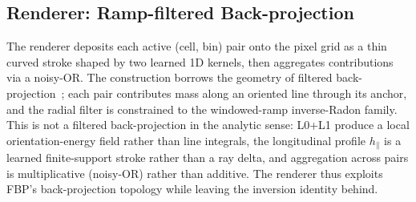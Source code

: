 \documentclass[11pt,a4paper]{article}
\begin{document}
\subsection{Renderer: Ramp-filtered Back-projection}\label{sec:render}

The renderer deposits each active (cell, bin) pair onto the pixel grid as a thin curved stroke shaped by two learned 1D kernels, then aggregates contributions via a noisy-OR. The construction borrows the geometry of filtered back-projection~\cite{kak2001ct}; each pair contributes mass along an oriented line through its anchor, and the radial filter is constrained to the windowed-ramp inverse-Radon family. This is not a filtered back-projection in the analytic sense: L0+L1 produce a local orientation-energy field rather than line integrals, the longitudinal profile $h_\parallel$ is a learned finite-support stroke rather than a ray delta, and aggregation across pairs is multiplicative (noisy-OR) rather than additive. The renderer thus exploits FBP's back-projection topology while leaving the inversion identity behind.
\end{document}
